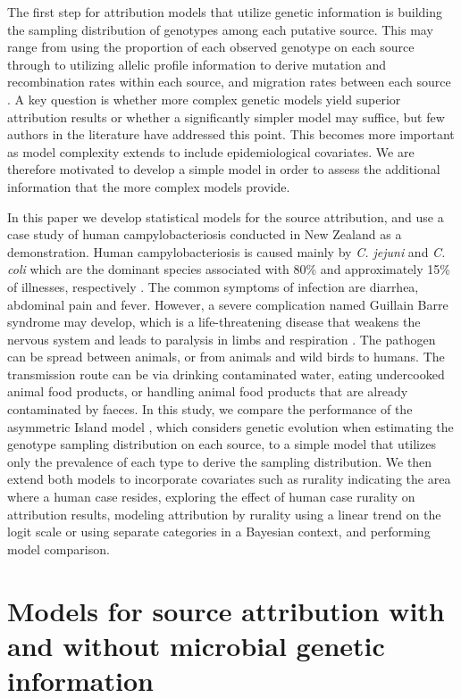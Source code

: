 \documentclass[times, doublespace]{simauth}%
\begin{document}
The first step for attribution models that utilize genetic information is building the sampling distribution of genotypes among each putative source. This may range from using the proportion of each observed genotype \cite{Hald} on each source through to utilizing allelic profile information to derive mutation and recombination rates within each source, and migration rates between each source \cite{Wilso}. A key question is whether more complex genetic models yield superior attribution results or whether a significantly simpler model may suffice, but few authors in the literature have addressed this point. This becomes more important as model complexity extends to include epidemiological covariates. We are therefore motivated to develop a simple model in order to assess the additional information that the more complex models provide.

In this paper we develop statistical models for the source attribution, and use a case study of human campylobacteriosis conducted in New Zealand \cite{Marsh} as a demonstration. Human campylobacteriosis is caused mainly by \textit{C. jejuni} and \textit{C. coli} which are the dominant species associated with 80\% and approximately 15\% of illnesses, respectively \cite{Guert}. The common symptoms of infection are diarrhea, abdominal pain and fever. However, a severe complication named Guillain Barre syndrome may develop, which is a life-threatening disease that weakens the nervous system and leads to paralysis in limbs and respiration \cite{Hanha}. The pathogen can be spread between animals, or from animals and wild birds to humans. The transmission route can be via drinking contaminated water, eating undercooked animal food products, or handling animal food products that are already contaminated by faeces. In this study, we compare the performance of the asymmetric Island model \cite{Wilso}, which considers genetic evolution when estimating the genotype sampling distribution on each source, to a simple model that utilizes only the prevalence of each type to derive the sampling distribution. We then extend both models to incorporate covariates such as rurality indicating the area where a human case resides, exploring the effect of human case rurality on attribution results, modeling attribution by rurality using a linear trend on the logit scale or using separate categories in a Bayesian context, and performing model comparison.

\section{Models for source attribution with and without microbial genetic information}
\end{document}
